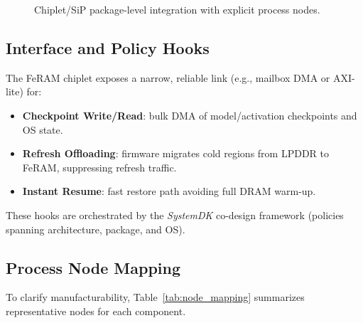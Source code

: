 \begin{figure}[t]
\centering
{}
\caption{Chiplet/SiP package-level integration with explicit process nodes.}
\label{fig:package_lpddr_feram}
\end{figure}

\subsection{Interface and Policy Hooks}
The FeRAM chiplet exposes a narrow, reliable link (e.g., mailbox DMA or AXI-lite) for:
\begin{itemize}
  \item \textbf{Checkpoint Write/Read}: bulk DMA of model/activation checkpoints and OS state.
  \item \textbf{Refresh Offloading}: firmware migrates cold regions from LPDDR to FeRAM, suppressing refresh traffic.
  \item \textbf{Instant Resume}: fast restore path avoiding full DRAM warm-up.
\end{itemize}
These hooks are orchestrated by the \emph{SystemDK} co-design framework (policies spanning architecture, package, and OS).

\subsection{Process Node Mapping}
To clarify manufacturability, Table~\ref{tab:node_mapping} summarizes representative nodes for each component.


